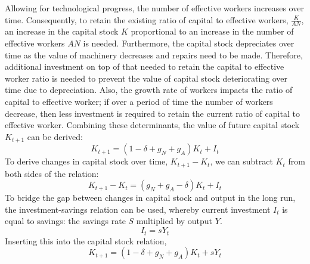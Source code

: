 \documentclass[
]{article}
\begin{document}
Allowing for technological progress, the number of effective workers
increases over time. Consequently, to retain the existing ratio of
capital to effective workers, {\(\frac{K}{AN}\)}, an increase in the
capital stock {\(K\)} proportional to an increase in the number of
effective workers {\(AN\)} is needed. Furthermore, the capital stock
depreciates over time as the value of machinery decreases and repairs
need to be made. Therefore, additional investment on top of that needed
to retain the capital to effective worker ratio is needed to prevent the
value of capital stock deteriorating over time due to depreciation.
Also, the growth rate of workers impacts the ratio of capital to
effective worker; if over a period of time the number of workers
decrease, then less investment is required to retain the current ratio
of capital to effective worker. Combining these determinants, the value
of future capital stock {\(K_{t + 1}\)} can be derived:
{\[K_{t + 1} = (1 - \delta + g_{N} + g_{A})K_{t} + I_{t}\]}To derive
changes in capital stock over time, {\(K_{t + 1} - K_{t}\)}, we can
subtract {\(K_{t}\)} from both sides of the relation:
{\[K_{t + 1} - K_{t} = (g_{N} + g_{A} - \delta)K_{t} + I_{t}\]}To bridge
the gap between changes in capital stock and output in the long run, the
investment-savings relation can be used, whereby current investment
{\(I_{t}\)} is equal to savings: the savings rate {\(S\)} multiplied by
output {\(Y\)}. {\[I_{t} = sY_{t}\]}Inserting this into the capital
stock relation,
{\[K_{t + 1} = (1 - \delta + g_{N} + g_{A})K_{t} + sY_{t}\]}
\end{document}
